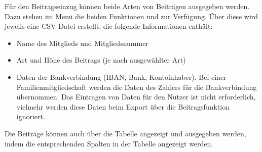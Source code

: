 \begin{neu}
Für den Beitragseinzug können beide Arten von Beiträgen ausgegeben werden.
Dazu stehen im Menü  die beiden Funktionen  und  zur Verfügung.
Über diese wird jeweils eine CSV-Datei erstellt, die folgende Informationen enthält:
\begin{itemize}
  \item
  Name des Mitglieds und Mitgliedsnummer
  \item
  Art und Höhe des Beitrags (je nach ausgewählter Art)
  \item
  Daten der Bankverbindung (IBAN, Bank, Kontoinhaber).
  Bei einer Familienmitgliedschaft werden die Daten des Zahlers für die Bankverbindung übernommen.
  Das Eintragen von Daten für den Nutzer ist nicht erforderlich,
  vielmehr werden diese Daten beim Export über die Beitragsfunktion ignoriert.
\end{itemize}

Die Beiträge können auch über die Tabelle angezeigt und ausgegeben werden,
indem die entsprechenden Spalten in der Tabelle angezeigt werden.
\end{neu}
